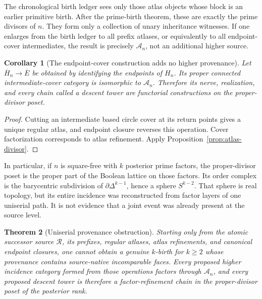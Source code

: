 \documentclass[11pt]{article}
\newtheorem{theorem}{Theorem}[section]
\newtheorem{corollary}[theorem]{Corollary}
\begin{document}
The chronological birth ledger sees only those atlas objects whose block is
an earlier primitive birth.  After the prime-birth theorem, these are exactly
the prime divisors of \(n\).  They form only a collection of unary inheritance
witnesses.  If one enlarges from the birth ledger to all prefix atlases, or
equivalently to all endpoint-cover intermediates, the result is precisely
\(\mathcal A_n\), not an additional higher source.

\begin{corollary}[The endpoint-cover construction adds no higher provenance]
\label{cor:return-divisor}
Let \(\overline H_n\to\overline E\) be obtained by identifying the endpoints of
\(H_n\).  Its proper connected intermediate-cover category is isomorphic to
\(\mathcal A_n\).  Therefore its nerve, realization, and every chain called a
descent tower are functorial constructions on the proper-divisor poset.
\end{corollary}

\begin{proof}
Cutting an intermediate based circle cover at its return points gives a unique
regular atlas, and endpoint closure reverses this operation.  Cover
factorization corresponds to atlas refinement.  Apply
Proposition~\ref{prop:atlas-divisor}.
\end{proof}

In particular, if \(n\) is square-free with \(k\) posterior prime factors, the
proper-divisor poset is the proper part of the Boolean lattice on those
factors.  Its order complex is the barycentric subdivision of
\(\partial\Delta^{k-1}\), hence a sphere \(S^{k-2}\).  That sphere is real
topology, but its entire incidence was reconstructed from factor layers of one
uniserial path.  It is not evidence that a joint event was already present at
the source level.

\begin{theorem}[Uniserial provenance obstruction]
\label{thm:uniserial-obstruction}
Starting only from the atomic successor source \(\mathscr R\), its prefixes,
regular atlases, atlas refinements, and canonical endpoint closures, one
cannot obtain a genuine \(k\)-birth for \(k\ge2\) whose provenance contains
source-native incomparable faces.  Every proposed higher incidence category
formed from those operations factors through \(\mathcal A_n\), and every
proposed descent tower is therefore a factor-refinement chain in the
proper-divisor poset of the posterior rank.
\end{theorem}
\end{document}
